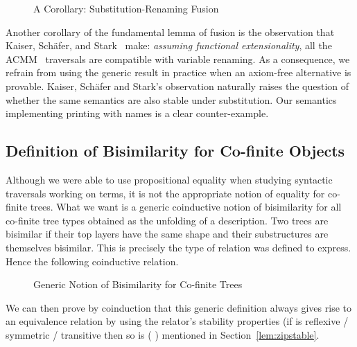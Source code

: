 {\begin{figure}[h]
\caption{A Corollary: Substitution-Renaming Fusion\label{defn:SubRen-Fusion}}
\end{figure}

Another corollary of the fundamental lemma of fusion is the observation that
Kaiser, Schäfer, and Stark~\citeyear{Kaiser-wsdebr} make: \emph{assuming
functional extensionality}, all the ACMM~\citeyear{allais2017type} traversals
are compatible with variable renaming.
As a consequence, we refrain from using the generic result in practice when
an axiom-free alternative is provable. Kaiser, Schäfer and Stark's observation
naturally raises the question of whether the same semantics are also stable
under substitution. Our semantics implementing printing with names is a clear
counter-example.



\subsection{Definition of Bisimilarity for Co-finite Objects}

Although we were able to use propositional equality when studying
syntactic traversals working on terms, it is not the appropriate
notion of equality for co-finite trees. What we want is a generic
coinductive notion of bisimilarity for all co-finite tree types
obtained as the unfolding of a description. Two trees are bisimilar
if their top layers have the same shape and their substructures are
themselves bisimilar. This is precisely the type of relation 
was defined to express. Hence the following coinductive relation.

\begin{figure}[h]
\caption{Generic Notion of Bisimilarity for Co-finite Trees\label{defn:bisimilar}}
\end{figure}

We can then prove by coinduction that this generic definition always gives
rise to an equivalence relation by using the relator's stability properties
(if  is reflexive / symmetric / transitive then so is {(   )}
mentioned in Section~\ref{lem:zipstable}.

}
